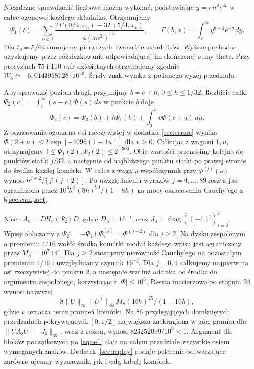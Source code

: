 \documentclass[11pt,a4paper,reqno]{amsart}
\numberwithin{equation}{section}
\begin{document}
Niezależne sprawdzenie liczbowe można wykonać, podstawiając \(y=\pi n^2 e^{4s}\) w całce ogonowej każdego składnika. Otrzymujemy
\[
 \Psi_1(t)=\sum_{n\ge1}\frac{2\Gamma(9/4,x_n)-3\Gamma(5/4,x_n)}
 {4(\pi n^2)^{1/4}},\qquad \Gamma(b,x)=\int_x^\infty y^{b-1}e^{-y}\,dy .
\]
Dla \(t_0=5/64\) sumujemy pierwszych dwanaście składników. Wyższe pochodne uzyskujemy przez różniczkowanie odpowiadającej im skończonej sumy theta. Przy precyzjach 75 i 110 cyfr dziesiętnych otrzymujemy zgodnie \(W_8\simeq-6{,}0143958728\cdot10^{49}\). Ścisły znak wynika z podanego wyżej przedziału.

Aby sprawdzić poziom drugi, przyjmijmy \(b=c+h\), \(0\le h\le1/32\). Rozbicie całki \(\Psi_2(c)=\int_c^\infty(s-c)\Phi(s)\,ds\) w punkcie \(b\) daje
\[
 \Psi_2(c)=\Psi_2(b)+h\Psi_1(b)+\int_0^h u\Phi(c+u)\,du .
\]
Z oszacowania ogona na osi rzeczywistej w dodatku~\ref{sec:errors} wynika \(\Phi(2+u)\le2\exp[-4096(1+4u)]\) dla \(u\ge0\). Całkując z wagami \(1,u\), otrzymujemy \(0\le\Psi_1(2),\Psi_2(2)\le2^{-500}\). Obie wartości przenosimy kolejno do punktów siatki \(j/32\), a następnie od najbliższego punktu siatki po prawej stronie do środka każdej komórki. W całce z wagą \(u\) współczynnik przy \(\Phi^{(j)}(c)\) wynosi \(h^{j+2}/[j!(j+2)]\). Po uwzględnieniu wyrazów \(j=0,\ldots,89\) reszta jest ograniczona przez \(10^6h^2(8h)^{90}/(1-8h)\) na mocy oszacowania Cauchy'ego z \S\ref{sec:compact}.

Niech \(A_8=DH_8(\Psi_2)D\), gdzie \(D_{ii}=16^{-i}\), oraz \(J_8=\operatorname{diag}((-1)^i)_{i=0}^7\). Wpisy obliczamy z \(\Psi_2'=-\Psi_1\) i \(\Psi_2^{(j)}=\Phi^{(j-2)}\) dla \(j\ge2\). Na dysku zespolonym o promieniu \(1/16\) wokół środka komórki moduł każdego wpisu jest ograniczony przez \(M_8=10^7\,14!\). Dla \(j\ge2\) stosujemy nierówność Cauchy'ego na pozostałym promieniu \(1/16\) i uwzględniamy czynnik \(16^{-j}\). Dla \(j=0,1\) całkujemy najpierw na osi rzeczywistej do punktu 2, a następnie wzdłuż odcinka od środka do argumentu zespolonego, korzystając z \(|\Phi|\le10^6\). Reszta macierzowa po stopniu 24 wynosi najwyżej
\[
 8\|U\|_\infty\|U^\top\|_\infty M_8(16h)^{25}/(1-16h),
\]
gdzie \(h\) oznacza teraz promień komórki. Na 86 przylegających domkniętych przedziałach pokrywających \([0,1/2]\) największa zaokrąglona w górę granica dla \(\|UA_8U^\top-J_8\|_\infty\), wraz z resztą, wynosi \(823252099/10^9<1\). Argument dla bloków początkowych po \eqref{eq:cell} daje na całym przedziale wszystkie osiem wymaganych znaków. Dodatek~\ref{sec:replay} podaje polecenie odtwarzające zarówno ujemny wyznacznik, jak i całą tabelę komórek.
\end{document}
